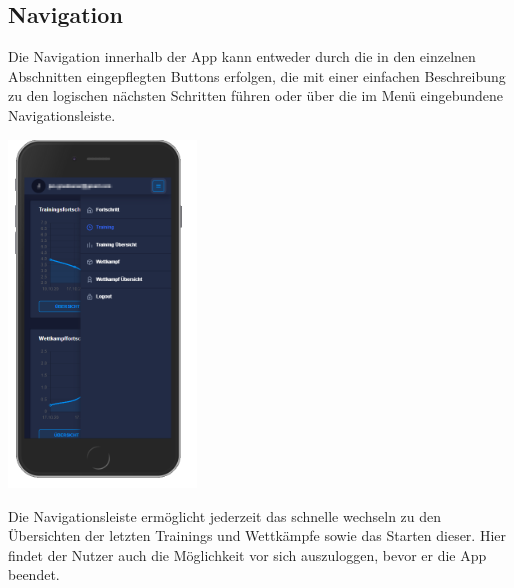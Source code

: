 \documentclass[a4paper]{article}
\theoremstyle{definition}
\begin{document}
\subsection*{Navigation}
Die Navigation innerhalb der App kann entweder durch die in den einzelnen Abschnitten eingepflegten Buttons erfolgen, die mit einer einfachen Beschreibung zu den logischen nächsten Schritten führen oder über die im Menü eingebundene Navigationsleiste.
\begin{center}
	\includegraphics[width= 5cm, keepaspectratio]{img/nav}
\end{center}
Die Navigationsleiste ermöglicht jederzeit das schnelle wechseln zu den Übersichten der letzten Trainings und Wettkämpfe sowie das Starten dieser. Hier findet der Nutzer auch die Möglichkeit vor sich auszuloggen, bevor er die App beendet.
\end{document}

